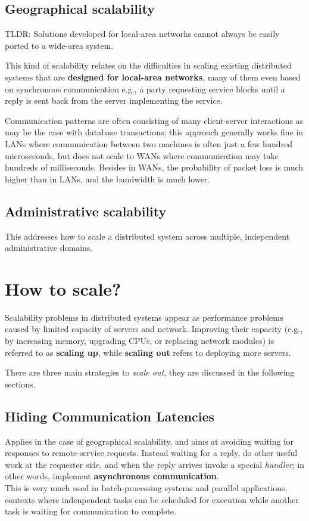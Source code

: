 \subsection{Geographical scalability}

TLDR: Solutions developed for local-area networks cannot always be easily ported to a wide-area system.

This kind of scalability relates on the difficulties in scaling existing distributed systems that are \textbf{designed for local-area networks}, many of them even based on synchronous communication e.g., a party requesting service blocks until a reply is sent back from the server implementing the service.

Communication patterns are often consisting of many client-server interactions as may be the case with database transactions;
this approach generally works fine in LANs where communication between two machines is often just a few hundred microseconds, but does not scale to WANs where communication may take hundreds of milliseconds.
Besides in WANs, the probability of packet loss is much higher than in LANs, and the bandwidth is much lower.

\subsection{Administrative scalability}
This addresses how to scale a distributed system across multiple, independent administrative domains.

\section{How to scale?}
Scalability problems in distributed systems appear as performance problems caused by limited capacity of servers and network. 
Improving their capacity (e.g., by increasing memory, upgrading CPUs, or replacing network modules) is referred to as \textbf{scaling up}, while \textbf{scaling out} refers to deploying more servers.

There are three main strategies to \textit{scale out}, they are discussed in the following sections.

\subsection{Hiding Communication Latencies}
Applies in the case of geographical scalability, and aims at avoiding waiting for responses to remote-service requests.
Instead waiting for a reply, do other useful work at the requester side, and when the reply arrives invoke a special \textit{handler};
in other words, implement \textbf{asynchronous communication}.\\
This is very much used in batch-processing systems and parallel applications, contexts where indenpendent tasks can be  scheduled for execution while another task is waiting for communication to complete.


